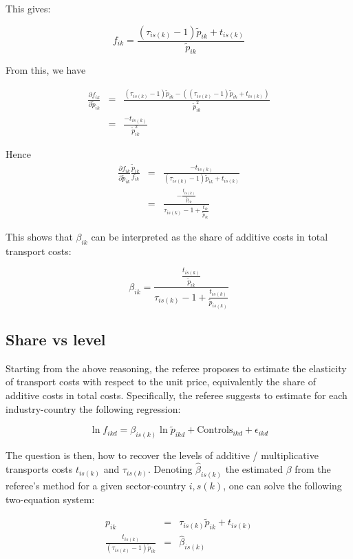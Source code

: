 \documentclass[a4paper,12pt]{article}
\begin{document}
This gives:

$$f_{ik} = \frac{(\tau_{is(k)}-1)\tilde{p}_{ik}+t_{is(k)}}{\tilde{p}_{ik}}$$

From this, we have

\begin{eqnarray*}
\frac{\partial f_{ik}}{\partial \tilde{p}_{ik}} &=& \frac{(\tau_{is(k)}-1)\tilde{p}_{ik} - ((\tau_{is(k)}-1)\tilde{p}_{ik} +t_{is(k)})}{\tilde{p}_{ik}^2} \\
&=& \frac{-t_{is(k)}}{\tilde{p}_{ik}^2}
\end{eqnarray*}

Hence
\begin{eqnarray*}
\frac{\partial f_{ik}}{\partial \tilde{p}_{ik}} \frac{\tilde{p}_{ik}}{f_{ik}}&=& \frac{-t_{is(k)}}{(\tau_{is(k)}-1)\tilde{p}_{ik} +t_{is(k)}}\\
&=& \frac{-\frac{t_{is(k)}}{\tilde{p}_{ik}}}{\tau_{is(k)}-1 +\frac{t_{ik}}{\tilde{p}_{ik}}}
\end{eqnarray*}

This shows that $\beta_{ik}$ can be interpreted as the share of additive costs in total transport costs:

$$\beta_{ik} = \frac{\frac{t_{is(k)}}{\tilde{p}_{ik}}}{\tau_{is(k)}-1 + \frac{t_{is(k)}}{\tilde{p}_{is(k)}}} $$


\subsection{Share vs level}

Starting from the above reasoning, the referee proposes to estimate the elasticity of transport costs with respect to the unit price, equivalently the share of additive costs in total costs. Specifically, the referee suggests to estimate for each industry-country the following regression:

$$\ln f_{ikd}= \beta_{is(k)} \ln \widetilde{p}_{ikd} + \text{Controls}_{ikd} +\epsilon_{ikd}$$

The question is then, how to recover the levels of additive / multiplicative transports costs $t_{is(k)}$ and $\tau_{is(k)}$. Denoting $\widehat{\beta}_{is(k)}$ the estimated $\beta$ from the referee's method for a given sector-country $i,s(k)$, one can solve the following two-equation system:

\begin{eqnarray}
p_{ik} &=& \tau_{is(k)}\widetilde{p}_{ik} +t_{is(k)} \label{eq:system1}\\
\frac{t_{is(k)}}{(\tau_{is(k)}-1)\widetilde{p}_{ik}} &=& \widehat{\beta}_{is(k)}  \label{eq:system2}
\end{eqnarray}
\end{document}
